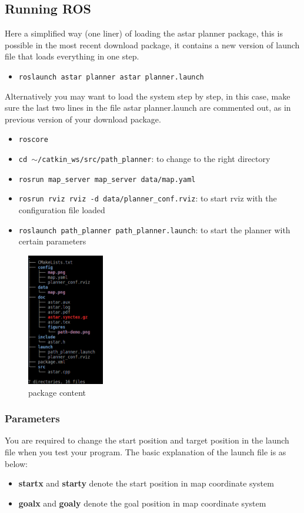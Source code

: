 \documentclass[twoside,11pt]{article}
\begin{document}
\subsection*{Running ROS}
Here a simplified way (one liner) of loading the astar planner package, this is possible in the most
recent download package, it contains a new version of launch file that loads everything in one step.
\begin{itemize}
	\item \texttt{roslaunch astar planner astar planner.launch}
\end{itemize}
Alternatively you may want to load the system step by step, in this case, make sure the last two
lines in the file astar planner.launch are commented out, as in previous version of your download
package.
\begin{itemize}
	\item \texttt{roscore}
	\item \texttt{cd $\sim$/catkin\_ws/src/path\_planner}: to change to the right directory
	\item \texttt{rosrun map\_server map\_server data/map.yaml}
	\item \texttt{rosrun rviz rviz -d data/planner\_conf.rviz}: to start rviz with the configuration file loaded
	\item \texttt{roslaunch path\_planner path\_planner.launch}: to start the planner with certain parameters
\end{itemize}
\begin{figure}[h!]
	\caption{package content}
	\centering
	\includegraphics[width=0.3\textwidth]{./figures/file-tree.png}
\end{figure}

\subsubsection*{Parameters}
You are required to change the start position and target position in the launch file when you test
your program. The basic explanation of the launch file is as below:
\begin{itemize}
	\item \textbf{startx} and \textbf{starty} denote the start position in map coordinate system
	\item \textbf{goalx} and \textbf{goaly} denote the goal position in map coordinate system
\end{itemize}
\end{document}
